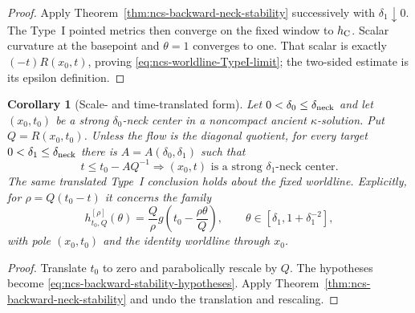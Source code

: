 \documentclass[10pt]{coll-l}
\newtheorem{corollary}[theorem]{Corollary}
\theoremstyle{definition}
\theoremstyle{remark}
\numberwithin{section}{chapter}
\numberwithin{equation}{chapter}
\begin{document}
\begin{proof}
Apply Theorem~\ref{thm:ncs-backward-neck-stability} successively with
$\delta_1\downarrow0$.  The Type~I pointed metrics then converge on the
fixed window to $h_{\rm C}$.  Scalar curvature at the basepoint and
$\theta=1$ converges to one.  That scalar is exactly
$(-t)R(x_0,t)$, proving \eqref{eq:ncs-worldline-TypeI-limit}; the two-sided
estimate is its epsilon definition.
\end{proof}

\begin{corollary}[Scale- and time-translated form]
\label{cor:ncs-neck-persistence-past}
Let $0<\delta_0\leq\delta_{\rm neck}$ and let $(x_0,t_0)$ be a strong
$\delta_0$-neck center in a noncompact ancient $\kappa$-solution.  Put
$Q=R(x_0,t_0)$.  Unless the flow is the diagonal quotient, for every target
$0<\delta_1\leq\delta_{\rm neck}$ there is
$A=A(\delta_0,\delta_1)$ such that
\begin{equation}
 t\leq t_0-AQ^{-1}
   \Longrightarrow (x_0,t)\text{ is a strong }\delta_1\text{-neck center}.
                                                               \label{eq:ncs-translated-neck-persistence}
\end{equation}
The same translated Type~I conclusion holds about the fixed worldline.
Explicitly, for $\rho=Q(t_0-t)$ it concerns the family
\begin{equation}
 h_{t_0,Q}^{[\rho]}(\theta)
      =\frac{Q}{\rho}
         g\!\left(t_0-\frac{\rho\theta}{Q}\right),\qquad
 \theta\in[\delta_1,1+\delta_1^{-2}],                 \label{eq:ncs-translated-TypeI-family}
\end{equation}
with pole $(x_0,t_0)$ and the identity worldline through $x_0$.
\end{corollary}

\begin{proof}
Translate $t_0$ to zero and parabolically rescale by $Q$.  The hypotheses
become \eqref{eq:ncs-backward-stability-hypotheses}.  Apply
Theorem~\ref{thm:ncs-backward-neck-stability} and undo the translation and
rescaling.
\end{proof}
\end{document}

